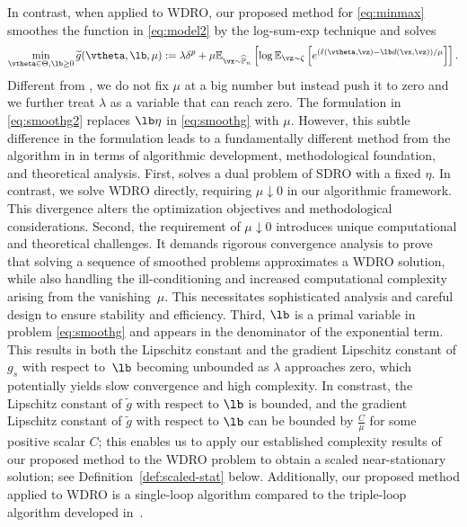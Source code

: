 		In contrast, when applied to WDRO, our proposed method for \eqref{eq:minmax} smoothes the function in \eqref{eq:model2} by the log-sum-exp technique and solves 
		\begin{equation}
			\label{eq:smoothg2}
			\min_{\vtheta \in \Theta, \lb \geq 0} \widetilde{g}(\vtheta, \lb, \mu) := \lambda \delta^p + \mu \mathbb{E}_{\vx \sim \widehat{\mathbb{P}}_n}\left[\log \mathbb{E}_{\vz \sim \zeta}\left[e^{(\ell(\vtheta, \vz) -\lb d(\vx, \vz)) / \mu}\right]\right].
		\end{equation}
		Different from \cite{wang2021sinkhorn}, we do not fix $\mu$ at a big number but instead push it to zero and we further treat $\lambda$ as a variable that can reach zero. The formulation in \eqref{eq:smoothg2} 
		replaces \(\lb \eta\) in \eqref{eq:smoothg} with \(\mu\).  However, this subtle difference in the formulation leads to a fundamentally different method  
		from the algorithm in \cite{wang2021sinkhorn} in terms of algorithmic development, methodological foundation, and theoretical analysis.
		First, \cite{wang2021sinkhorn}  
		solves a dual problem of SDRO with a  fixed  \(\eta\). In contrast, we  
		solve WDRO directly, requiring \(\mu \downarrow 0\) in our algorithmic framework. 
		This divergence alters the optimization objectives and methodological considerations.
		Second, the requirement of \(\mu \downarrow 0\)
		introduces unique computational and theoretical challenges. It demands rigorous convergence analysis  %
		to prove that solving a sequence of smoothed problems approximates a WDRO solution, while also handling the ill-conditioning and increased computational complexity arising from the vanishing~$\mu$. This necessitates sophisticated  
		analysis and careful design to ensure stability and efficiency.
		Third, \(\lb\) is a primal variable in problem \eqref{eq:smoothg} and appears in the denominator of the exponential term. 
		This results in both the Lipschitz constant and the gradient Lipschitz constant of 
		$g_s$  with respect to~$\lb$ becoming unbounded as 
		$\lambda$ approaches zero, which potentially yields slow convergence and high complexity. %
		In constrast, the Lipschitz constant of $\widetilde{g}$  with respect to \(\lb\) is bounded, and the gradient Lipschitz constant of $\widetilde{g}$   with respect to \(\lb\) can be bounded  by $\frac{C}{\mu}$ for some positive scalar $C$; %
		this enables us to apply our established complexity results of our proposed method to the WDRO problem to obtain a scaled near-stationary solution; see Definition~\ref{def:scaled-stat} below.
		Additionally, 
		our proposed method applied to WDRO is  
		a single-loop algorithm compared to the triple-loop algorithm developed in~\cite{wang2021sinkhorn}.
		
